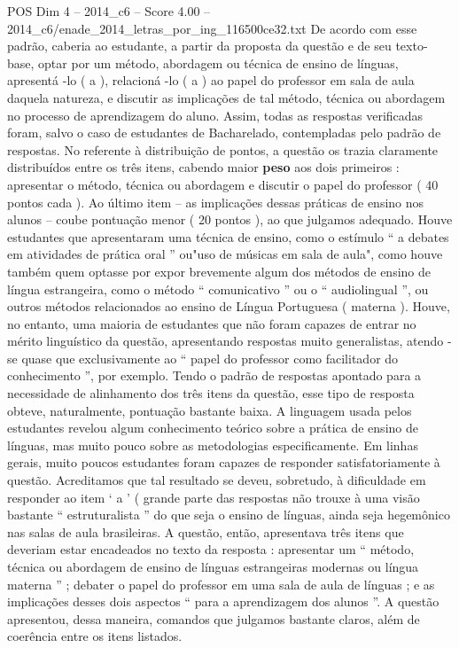 \begin{textsample}{POS Dim 4 – 2014\_c6 – Score 4.00 – 2014\_c6/enade\_2014\_letras\_por\_ing\_116500ce32.txt}
De acordo com esse padrão, caberia ao estudante, a partir da proposta da questão e de seu texto-base, optar por um método, abordagem ou técnica de ensino de línguas, apresentá -lo ( a ), relacioná -lo ( a ) ao papel do professor em sala de aula daquela natureza, e discutir as implicações de tal método, técnica ou abordagem no processo de aprendizagem do aluno.
Assim, todas as respostas verificadas foram, salvo o caso de estudantes de Bacharelado, contempladas pelo padrão de respostas.
No referente à distribuição de pontos, a questão os trazia claramente distribuídos entre os três itens, cabendo maior \textbf{peso} aos dois primeiros : apresentar o método, técnica ou abordagem e discutir o papel do professor ( 40 pontos cada ).
Ao último item – as implicações dessas práticas de ensino nos alunos – coube pontuação menor ( 20 pontos ), ao que julgamos adequado.
Houve estudantes que apresentaram uma técnica de ensino, como o estímulo “ a debates em atividades de prática oral ” ou"uso de músicas em sala de aula", como houve também quem optasse por expor brevemente algum dos métodos de ensino de língua estrangeira, como o método “ comunicativo ” ou o “ audiolingual ”, ou outros métodos relacionados ao ensino de Língua Portuguesa ( materna ).
Houve, no entanto, uma maioria de estudantes que não foram capazes de entrar no mérito linguístico da questão, apresentando respostas muito generalistas, atendo -se quase que exclusivamente ao “ papel do professor como facilitador do conhecimento ”, por exemplo.
Tendo o padrão de respostas apontado para a necessidade de alinhamento dos três itens da questão, esse tipo de resposta obteve, naturalmente, pontuação bastante baixa.
A linguagem usada pelos estudantes revelou algum conhecimento teórico sobre a prática de ensino de línguas, mas muito pouco sobre as metodologias especificamente.
Em linhas gerais, muito poucos estudantes foram capazes de responder satisfatoriamente à questão.
Acreditamos que tal resultado se deveu, sobretudo, à dificuldade em responder ao item ‘ a ’ ( grande parte das respostas não trouxe à uma visão bastante “ estruturalista ” do que seja o ensino de línguas, ainda seja hegemônico nas salas de aula brasileiras.
A questão, então, apresentava três itens que deveriam estar encadeados no texto da resposta : apresentar um “ método, técnica ou abordagem de ensino de línguas estrangeiras modernas ou língua materna ” ; debater o papel do professor em uma sala de aula de línguas ; e as implicações desses dois aspectos “ para a aprendizagem dos alunos ”.
A questão apresentou, dessa maneira, comandos que julgamos bastante claros, além de coerência entre os itens listados.

\end{textsample}
